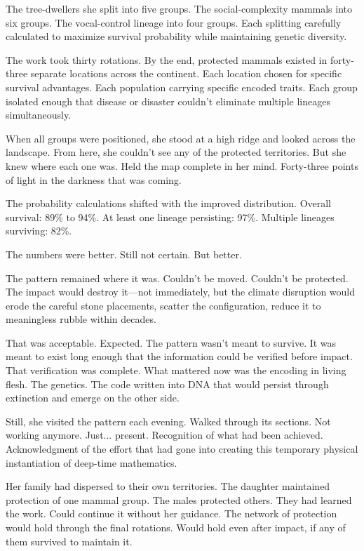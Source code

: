 The tree-dwellers she split into five groups. The social-complexity mammals into six groups. The vocal-control lineage into four groups. Each splitting carefully calculated to maximize survival probability while maintaining genetic diversity.

The work took thirty rotations. By the end, protected mammals existed in forty-three separate locations across the continent. Each location chosen for specific survival advantages. Each population carrying specific encoded traits. Each group isolated enough that disease or disaster couldn't eliminate multiple lineages simultaneously.

When all groups were positioned, she stood at a high ridge and looked across the landscape. From here, she couldn't see any of the protected territories. But she knew where each one was. Held the map complete in her mind. Forty-three points of light in the darkness that was coming.

The probability calculations shifted with the improved distribution. Overall survival: 89\% to 94\%. At least one lineage persisting: 97\%. Multiple lineages surviving: 82\%.

The numbers were better. Still not certain. But better.

\scenebreak

The pattern remained where it was. Couldn't be moved. Couldn't be protected. The impact would destroy it—not immediately, but the climate disruption would erode the careful stone placements, scatter the configuration, reduce it to meaningless rubble within decades.

That was acceptable. Expected. The pattern wasn't meant to survive. It was meant to exist long enough that the information could be verified before impact. That verification was complete. What mattered now was the encoding in living flesh. The genetics. The code written into DNA that would persist through extinction and emerge on the other side.

Still, she visited the pattern each evening. Walked through its sections. Not working anymore. Just... present. Recognition of what had been achieved. Acknowledgment of the effort that had gone into creating this temporary physical instantiation of deep-time mathematics.

Her family had dispersed to their own territories. The daughter maintained protection of one mammal group. The males protected others. They had learned the work. Could continue it without her guidance. The network of protection would hold through the final rotations. Would hold even after impact, if any of them survived to maintain it.

